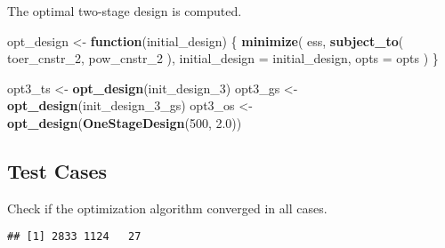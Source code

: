 \documentclass[]{book}
\newenvironment{Shaded}{\begin{snugshade}}{\end{snugshade}}
\newcommand{\ControlFlowTok}[1]{\textcolor[rgb]{0.13,0.29,0.53}{\textbf{#1}}}
\newcommand{\DataTypeTok}[1]{\textcolor[rgb]{0.13,0.29,0.53}{#1}}
\newcommand{\DecValTok}[1]{\textcolor[rgb]{0.00,0.00,0.81}{#1}}
\newcommand{\FloatTok}[1]{\textcolor[rgb]{0.00,0.00,0.81}{#1}}
\newcommand{\KeywordTok}[1]{\textcolor[rgb]{0.13,0.29,0.53}{\textbf{#1}}}
\newcommand{\NormalTok}[1]{#1}
\newcommand{\OperatorTok}[1]{\textcolor[rgb]{0.81,0.36,0.00}{\textbf{#1}}}
\newcommand{\StringTok}[1]{\textcolor[rgb]{0.31,0.60,0.02}{#1}}
\begin{document}
The optimal two-stage design is computed.

\begin{Shaded}
\begin{Highlighting}[]
\NormalTok{opt_design <-}\StringTok{ }\ControlFlowTok{function}\NormalTok{(initial_design) \{}
    \KeywordTok{minimize}\NormalTok{(}
\NormalTok{        ess,}
        \KeywordTok{subject_to}\NormalTok{(}
\NormalTok{            toer_cnstr_}\DecValTok{2}\NormalTok{,}
\NormalTok{            pow_cnstr_}\DecValTok{2}
\NormalTok{        ),}
        \DataTypeTok{initial_design =}\NormalTok{ initial_design,}
        \DataTypeTok{opts =}\NormalTok{ opts}
\NormalTok{    )}
\NormalTok{\}}

\NormalTok{opt3_ts <-}\StringTok{ }\KeywordTok{opt_design}\NormalTok{(init_design_}\DecValTok{3}\NormalTok{)}
\NormalTok{opt3_gs <-}\StringTok{ }\KeywordTok{opt_design}\NormalTok{(init_design_}\DecValTok{3}\NormalTok{_gs)}
\NormalTok{opt3_os <-}\StringTok{ }\KeywordTok{opt_design}\NormalTok{(}\KeywordTok{OneStageDesign}\NormalTok{(}\DecValTok{500}\NormalTok{, }\FloatTok{2.0}\NormalTok{))}
\end{Highlighting}
\end{Shaded}

\hypertarget{test-cases-9}{%
\subsection{Test Cases}\label{test-cases-9}}

Check if the optimization algorithm converged in all cases.

\begin{Shaded}
\end{Shaded}

\begin{verbatim}
## [1] 2833 1124   27
\end{verbatim}

\begin{Shaded}
\end{Shaded}
\end{document}
